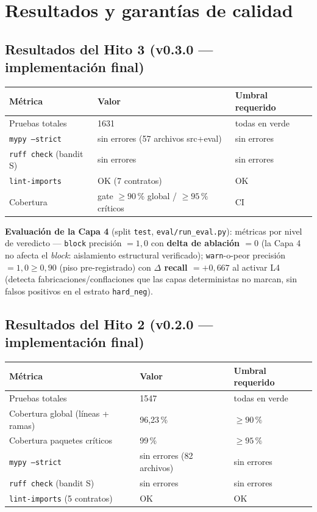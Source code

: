 \documentclass[11pt,a4paper]{article}
\begin{document}
\section{Resultados y garantías de calidad}

\subsection{Resultados del Hito 3 (v0.3.0 --- implementación final)}

\begin{center}
\small
\begin{tabular}{@{}lll@{}}
\toprule
\textbf{Métrica} & \textbf{Valor} & \textbf{Umbral requerido} \\
\midrule
Pruebas totales & 1631 & todas en verde \\
\texttt{mypy --strict} & sin errores (57 archivos src+eval) & sin errores \\
\texttt{ruff check} (bandit S) & sin errores & sin errores \\
\texttt{lint-imports} & OK (7 contratos) & OK \\
Cobertura & gate $\ge 90\,\%$ global / $\ge 95\,\%$ críticos & CI \\
\bottomrule
\end{tabular}
\end{center}

\noindent\textbf{Evaluación de la Capa 4} (split \texttt{test}, \texttt{eval/run\_eval.py}):
métricas por nivel de veredicto --- \texttt{block} precisión $=1{,}0$ con \textbf{delta de
ablación $=0$} (la Capa 4 no afecta el \emph{block}: aislamiento estructural verificado);
\texttt{warn}-o-peor precisión $=1{,}0 \ge 0{,}90$ (piso pre-registrado) con \textbf{$\Delta$
recall $=+0{,}667$} al activar L4 (detecta fabricaciones/conflaciones que las capas
deterministas no marcan, sin falsos positivos en el estrato \texttt{hard\_neg}).

\subsection{Resultados del Hito 2 (v0.2.0 --- implementación final)}

\begin{center}
\small
\begin{tabular}{@{}lll@{}}
\toprule
\textbf{Métrica} & \textbf{Valor} & \textbf{Umbral requerido} \\
\midrule
Pruebas totales & 1547 & todas en verde \\
Cobertura global (líneas + ramas) & 96{,}23\,\% & $\geq 90\,\%$ \\
Cobertura paquetes críticos & 99\,\% & $\geq 95\,\%$ \\
\texttt{mypy --strict} & sin errores (82 archivos) & sin errores \\
\texttt{ruff check} (bandit S) & sin errores & sin errores \\
\texttt{lint-imports} (5 contratos) & OK & OK \\
\bottomrule
\end{tabular}
\end{center}
\end{document}
